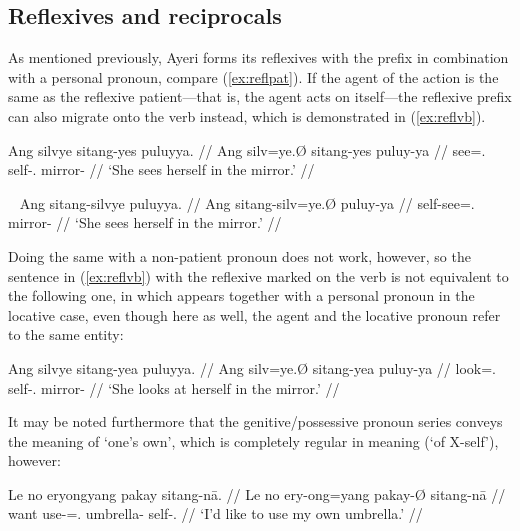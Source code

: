 
\subsection{Reflexives and reciprocals}
\label{subsec:reflrec}

As mentioned previously, Ayeri forms its reflexives with the prefix 
 in combination with a personal pronoun, compare 
(\ref{ex:reflpat}). If the agent of the action is the same as the reflexive 
patient---that is, the agent acts on itself---the reflexive prefix can also 
migrate onto the verb instead, which is demonstrated in (\ref{ex:reflvb}).

\ex\label{ex:reflpat}\begingl
	\gla Ang silvye sitang-yes puluyya. //
	\glb Ang silv=ye.Ø sitang-yes puluy-ya //
	\glc \AgtT{} see=\TsgF{}.\Top{} self-\TsgF{}.\Parg{} mirror-\Loc{} //
	\glft `She sees herself in the mirror.' //
\endgl\xe

\ex~\label{ex:reflvb}\begingl
	\gla Ang sitang-silvye puluyya. //
	\glb Ang sitang-silv=ye.Ø puluy-ya //
	\glc \AgtT{} self-see=\TsgF{}.\Top{} mirror-\Loc{} //
	\glft `She sees herself in the mirror.' //
\endgl\xe

Doing the same with a non-patient pronoun does not work, however, so the
sentence in (\ref{ex:reflvb}) with the reflexive  marked
on the verb is not equivalent to the following one, in which
 appears together with a personal pronoun in the locative
case, even though here as well, the agent and the locative pronoun refer to the
same entity:

\ex\label{ex:reflloc}\begingl
	\gla Ang silvye sitang-yea puluyya. //
	\glb Ang silv=ye.Ø sitang-yea puluy-ya //
	\glc \AgtT{} look=\TsgF{}.\Top{} self-\TsgF{}.\Loc{} mirror-\Loc{} //
	\glft `She looks at herself in the mirror.' //
\endgl\xe

It may be noted furthermore that the genitive/possessive pronoun series conveys 
the meaning of `one's own', which is completely regular in meaning (`of 
X-self'), however:

\ex\begingl
	\gla Le no eryongyang pakay sitang-nā. //
	\glb Le no ery-ong=yang pakay-Ø sitang-nā //
	\glc \PatTI{} want use-\Irr{}=\Fsg{}.\Aarg{} umbrella-\Top{} 
		self-\Fsg{}.\Gen{} //
	\glft `I'd like to use my own umbrella.' //
\endgl\xe



